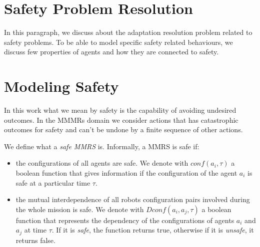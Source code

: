 \documentclass[journal]{IEEEtran}
\theoremstyle{definition}
\begin{document}







\section{Safety Problem Resolution} 

In this paragraph, we discuss about the adaptation resolution problem related to safety problems. To be able to model specific safety related behaviours, we discuss few properties of agents and how they are connected to safety.

\section{Modeling Safety}






In this work what we mean by safety is the capability of avoiding undesired outcomes. In the MMMRs domain we consider actions that has catastrophic outcomes for safety and can't be undone by a finite sequence of other actions. 

We define what a \textit{safe MMRS} is. Informally, a MMRS is safe if:
\begin{itemize}
\item the configurations of all agents are safe. We denote with $conf(a_i, \tau)$ a boolean function that gives information if the configuration of the agent $a_i$ is safe at a particular time $\tau$.
\item the mutual interdependence of all robots configuration pairs involved during the whole mission is safe. We denote with $Dconf(a_i, a_j,\tau)$ a boolean function that represents the dependency of the configurations of agents $a_i$ and $a_j$ at time $\tau$. If it is \textit{safe}, the function returns true, otherwise if it is \textit{unsafe}, it returns false.
\end{itemize}
\end{document}
